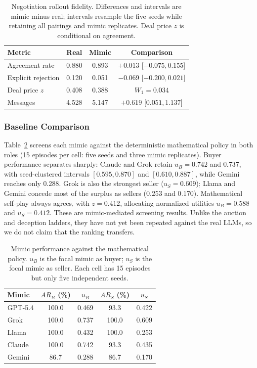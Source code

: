 \begin{table}[htbp]
\caption{Negotiation rollout fidelity. Differences and intervals are mimic minus real; intervals resample the five seeds while retaining all pairings and mimic replicates. Deal price $z$ is conditional on agreement.}
\label{tab:neg_fidelity}
\centering
\begin{tabular}{lccc}
\hline
Metric & Real & Mimic & Comparison \\
\hline
Agreement rate & 0.880 & 0.893 & $+0.013$ [$-0.075,0.155$] \\
Explicit rejection & 0.120 & 0.051 & $-0.069$ [$-0.200,0.021$] \\
Deal price $z$ & 0.408 & 0.388 & $W_1=0.034$ \\
Messages & 4.528 & 5.147 & $+0.619$ [$0.051,1.137$] \\
\hline
\end{tabular}
\end{table}

\subsubsection{Baseline Comparison}

Table~\ref{tab:neg_baseline} screens each mimic against the deterministic mathematical policy in both roles (15 episodes per cell: five seeds and three mimic replicates). Buyer performance separates sharply: Claude and Grok retain $u_B=0.742$ and $0.737$, with seed-clustered intervals $[0.595,0.870]$ and $[0.610,0.887]$, while Gemini reaches only $0.288$. Grok is also the strongest seller ($u_S=0.609$); Llama and Gemini concede most of the surplus as sellers ($0.253$ and $0.170$). Mathematical self-play always agrees, with $z=0.412$, allocating normalized utilities $u_B=0.588$ and $u_S=0.412$. These are mimic-mediated screening results. Unlike the auction and deception ladders, they have not yet been repeated against the real LLMs, so we do not claim that the ranking transfers.

\begin{table}[htbp]
\caption{Mimic performance against the mathematical policy. $u_B$ is the focal mimic as buyer; $u_S$ is the focal mimic as seller. Each cell has 15 episodes but only five independent seeds.}
\label{tab:neg_baseline}
\centering
\begin{tabular}{lcccc}
\hline
Mimic & $AR_B$ (\%) & $u_B$ & $AR_S$ (\%) & $u_S$ \\
\hline
GPT-5.4 & 100.0 & 0.469 & 93.3 & 0.422 \\
Grok    & 100.0 & 0.737 & 100.0 & 0.609 \\
Llama   & 100.0 & 0.432 & 100.0 & 0.253 \\
Claude  & 100.0 & 0.742 & 93.3 & 0.435 \\
Gemini  & 86.7 & 0.288 & 86.7 & 0.170 \\
\hline
\end{tabular}
\end{table}

